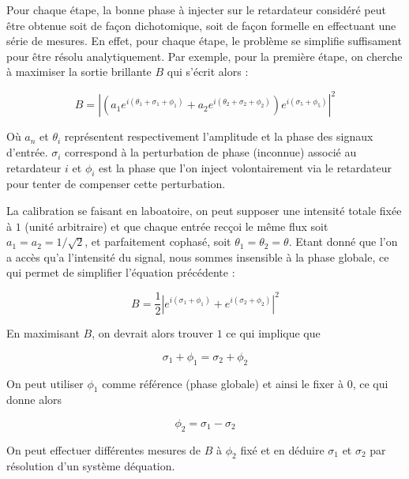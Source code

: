 \documentclass{aa}
\begin{document}
            Pour chaque étape, la bonne phase à injecter sur le retardateur considéré peut être obtenue soit de façon dichotomique, soit de façon formelle en effectuant une série de mesures. En effet, pour chaque étape, le problème se simplifie suffisament pour être résolu analytiquement. Par exemple, pour la première étape, on cherche à maximiser la sortie brillante $B$ qui s'écrit alors :

            \begin{equation}
                B = \left|\left(a_1 e^{i(\theta_1 + \sigma_1 + \phi_1)} + a_2 e^{i(\theta_2 + \sigma_2 + \phi_2)}\right) e^{i(\sigma_5 + \phi_5)}\right|^2
            \end{equation}

            Où $a_n$ et $\theta_i$ représentent respectivement l'amplitude et la phase des signaux d'entrée. $\sigma_i$ correspond à la perturbation de phase (inconnue) associé au retardateur $i$ et $\phi_i$ est la phase que l'on inject volontairement via le retardateur pour tenter de compenser cette perturbation.

            La calibration se faisant en laboatoire, on peut supposer une intensité totale fixée à $1$ (unité arbitraire) et que chaque entrée recçoi le même flux soit $a_1 = a_2 = 1/\sqrt{2}$, et parfaitement cophasé, soit $\theta_1 = \theta_2 = \theta$. Etant donné que l'on a accès qu'a l'intensité du signal, nous sommes insensible à la phase globale, ce qui permet de simplifier l'équation précédente :

            \begin{equation}
                B = \frac{1}{2} \left|e^{i(\sigma_1 + \phi_1)} + e^{i(\sigma_2 + \phi_2)}\right|^2
            \end{equation}

            En maximisant $B$, on devrait alors trouver $1$ ce qui implique que

            \begin{equation}
                \sigma_1 + \phi_1 = \sigma_2 + \phi_2
            \end{equation}

            On peut utiliser $\phi_1$ comme référence (phase globale) et ainsi le fixer à 0, ce qui donne alors

            \begin{equation}
                \phi_2 = \sigma_1 - \sigma_2
            \end{equation}

            On peut effectuer différentes mesures de $B$ à $\phi_2$ fixé et en déduire $\sigma_1$ et $\sigma_2$ par résolution d'un système déquation.
\end{document}
